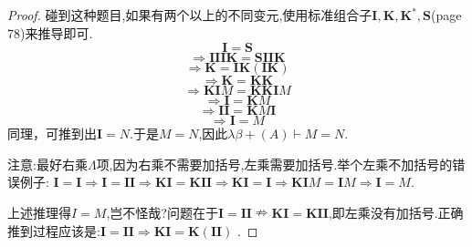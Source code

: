 
\begin{proof}

碰到这种题目,如果有两个以上的不同变元,使用标准组合子$\mathbf{I}, \mathbf{K}, \mathbf{K^*}, \mathbf{S}$(page 78)来推导即可.
$$ \mathbf{I} = \mathbf{S} $$
$$\Rightarrow \mathbf{IIIK}=\mathbf{SIIK} $$
$$\Rightarrow \mathbf{K}=\mathbf{IK(IK)} $$
$$\Rightarrow \mathbf{K}=\mathbf{KK} $$
$$\Rightarrow \mathbf{KI}M=\mathbf{KKI}M $$
$$\Rightarrow \mathbf{I}=\mathbf{K}M $$
$$\Rightarrow \mathbf{II}=\mathbf{K}M\mathbf{I} $$
$$\Rightarrow \mathbf{I}=M $$
同理，可推到出$ \mathbf{I}=N $.于是$M=N $,因此$\lambda \beta + (A) \vdash M=N$.

{\color {red} {注意:最好右乘$\Lambda$项,因为右乘不需要加括号,左乘需要加括号.举个左乘不加括号的错误例子: $\mathbf{I} = \mathbf{I} \Rightarrow \mathbf{I} = \mathbf{II}  \Rightarrow \mathbf{KI} = \mathbf{KII} \Rightarrow \mathbf{KI} = \mathbf{I} \Rightarrow \mathbf{K} \mathbf{I}M = \mathbf{I}M \Rightarrow \mathbf{I} = M $}}.

{\color {red} {上述推理得$I=M$,岂不怪哉?问题在于$\mathbf{I} = \mathbf{I}\mathbf{I}  \nRightarrow \mathbf{K}\mathbf{I} = \mathbf{K}\mathbf{I}\mathbf{I}$,即左乘没有加括号.正确推到过程应该是:$\mathbf{I} = \mathbf{I}\mathbf{I}  \Rightarrow \mathbf{K}\mathbf{I} = \mathbf{K}(\mathbf{I}\mathbf{I})$ }}.

\end{proof}